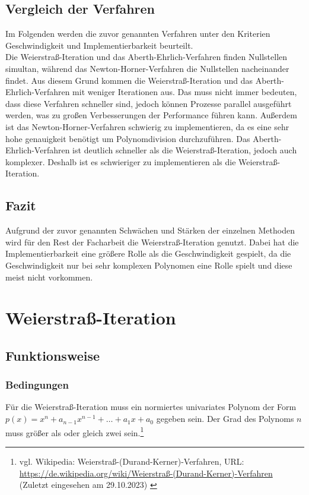 \documentclass[12pt]{article}
\begin{document}
\subsection{Vergleich der Verfahren}
Im Folgenden werden die zuvor genannten Verfahren unter den Kriterien Geschwindigkeit und Implementierbarkeit beurteilt.\\
Die Weierstraß-Iteration und das Aberth-Ehrlich-Verfahren finden Nullstellen simultan, während das Newton-Horner-Verfahren die Nullstellen nacheinander findet. Aus diesem Grund kommen die Weierstraß-Iteration und das Aberth-Ehrlich-Verfahren mit weniger Iterationen aus. Das muss nicht immer bedeuten, dass diese Verfahren schneller sind, jedoch können Prozesse parallel ausgeführt werden, was zu großen Verbesserungen der Performance führen kann. Außerdem ist das Newton-Horner-Verfahren schwierig zu implementieren, da es eine sehr hohe genauigkeit benötigt um Polynomdivision durchzuführen. Das Aberth-Ehrlich-Verfahren ist deutlich schneller als die Weierstraß-Iteration, jedoch auch komplexer. Deshalb ist es schwieriger zu implementieren als die Weierstraß-Iteration.

\subsection{Fazit}
Aufgrund der zuvor genannten Schwächen und Stärken der einzelnen Methoden wird für den Rest der Facharbeit die Weierstraß-Iteration genutzt. Dabei hat die Implementierbarkeit eine größere Rolle als die Geschwindigkeit gespielt, da die Geschwindigkeit nur bei sehr komplexen Polynomen eine Rolle spielt und diese meist nicht vorkommen.

\section{Weierstraß-Iteration}
\subsection{Funktionsweise}
\subsubsection{Bedingungen}
Für die Weierstraß-Iteration muss ein normiertes univariates Polynom der Form $p(x) = x^n + a_{n-1} x^{n-1} + \dots + a_1 x + a_0$ gegeben sein. Der Grad des Polynoms $n$ muss größer als oder gleich zwei sein.\footnote{
    vgl. Wikipedia: Weierstraß-(Durand-Kerner)-Verfahren, URL: \url{https://de.wikipedia.org/wiki/Weierstraß-(Durand-Kerner)-Verfahren} (Zuletzt eingesehen am 29.10.2023)
    \label{ftn:Wikipedia-Weierstraß-Methode}
}
\end{document}

